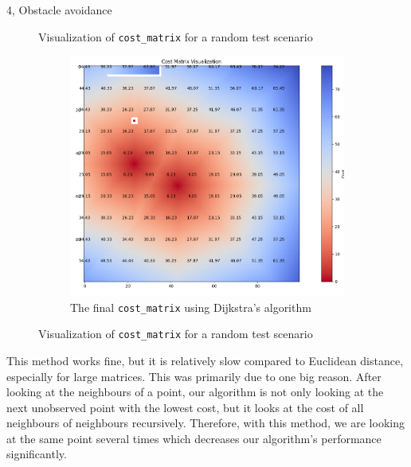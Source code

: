 \documentclass[10pt,a4paper]{article}
\begin{document}
\begin{task}{4, Obstacle avoidance}
\begin{figure}[H]
\caption{Visualization of \texttt{cost\_matrix} for a random test scenario}
\end{figure}
 
\begin{figure}[H] \ContinuedFloat
\begin{center}
    

\begin{subfigure}{0.65\textwidth}
 \centering
 \includegraphics[width=1\textwidth]{images/task4_dij_2d_full.png}
 \caption{The final \texttt{cost\_matrix} using Dijkstra's algorithm}
 \end{subfigure}
\end{center}


\caption{Visualization of \texttt{cost\_matrix} for a random test scenario}
 \label{fig:task4_dij2D}
\end{figure}



This method works fine, but it is relatively slow compared to Euclidean distance, especially for large matrices. This was primarily due to one big reason. After looking at the neighbours of a point, our algorithm is not only looking at the next unobserved point with the lowest cost, but it looks at the cost of all neighbours of neighbours recursively. Therefore, with this method, we are looking at the same point several times which decreases our algorithm's performance significantly. \\


\end{task}
\end{document}
